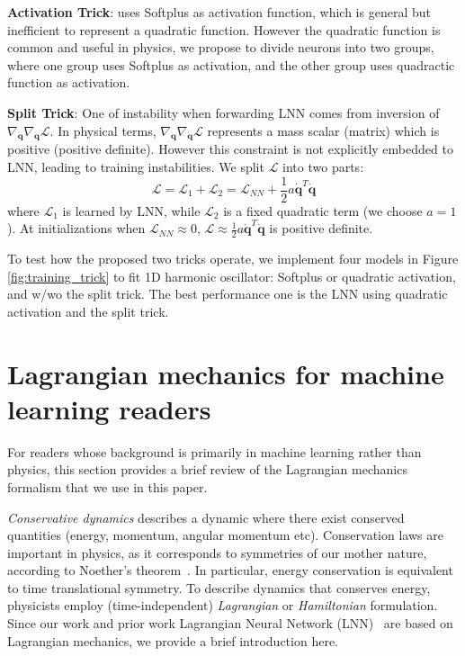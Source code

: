 \documentclass[aps,pre,reprint,superscriptaddress,nofootinbib,amsmath,amssymb]{revtex4-2}
\newcommand{\mat}[1]{\mathbf{#1}}
\newcommand{\qd}{\dot{\mat{q}}}
\newcommand{\lag}{\mathcal{L}}
\begin{document}
{\bf Activation Trick}: \cite{cranmer2020lagrangian} uses Softplus as activation function, which is general but inefficient to represent a quadratic function. However the quadratic function is common and useful in physics, we propose to divide neurons into two groups, where one group uses Softplus as activation, and the other group uses quadractic function as activation.

{\bf Split Trick}:
One of instability when forwarding LNN comes from inversion of $\nabla_{\qd}\nabla_{\qd}\lag$. In physical terms, $\nabla_{\qd}\nabla_{\qd}\lag$ represents a mass scalar (matrix) which is positive (positive definite). However this constraint is not explicitly embedded to LNN, leading to training instabilities. We split $\lag$ into two parts:
\begin{equation}
	\lag=\lag_1+\lag_2=\lag_{NN}+\frac{1}{2}a\qd^T\qd
\end{equation}
where $\lag_1$ is learned by LNN, while $\lag_2$ is a fixed quadratic term (we choose $a=1$). At initializations when $\lag_{NN}\approx 0$, $\lag\approx \frac{1}{2}a\qd^T\qd$ is positive definite.

To test how the proposed two tricks operate, we implement four models in Figure \ref{fig:training_trick} to fit 1D harmonic oscillator: Softplus or quadratic activation, and w/wo the split trick. The best performance one is the LNN using quadratic activation and the split trick.


\section{Lagrangian mechanics for machine learning readers}\label{app:ml_lag}

For readers whose background is primarily in machine learning rather than physics, this section provides a brief review of the Lagrangian mechanics formalism that we use in this paper.

\textit{Conservative dynamics} describes a dynamic where there exist conserved quantities (energy, momentum, angular momentum etc). Conservation laws are important in physics, as it corresponds to symmetries of our mother nature, according to Noether's theorem~\cite{hanc2004symmetries}. In particular, energy conservation is equivalent to time translational symmetry. To describe dynamics that conserves energy, physicists employ (time-independent) \textit{Lagrangian} or \textit{Hamiltonian} formulation. Since our work and prior work Lagrangian Neural Network (LNN)~\cite{cranmer2020lagrangian} are based on Lagrangian mechanics, we provide a brief introduction here.
\end{document}
